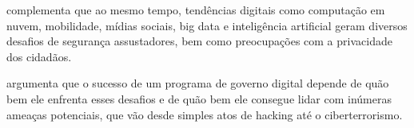 \cite{bounabat2017government} complementa que ao mesmo tempo, tendências digitais como computação em nuvem, mobilidade, mídias sociais, big data e inteligência artificial geram diversos desafios de segurança assustadores, bem como preocupações com a privacidade dos cidadãos. 

\cite{bounabat2017government} argumenta que o sucesso de um programa de governo digital depende de quão bem ele enfrenta esses desafios e de quão bem ele consegue lidar com inúmeras ameaças potenciais, que vão desde simples atos de hacking até o ciberterrorismo.